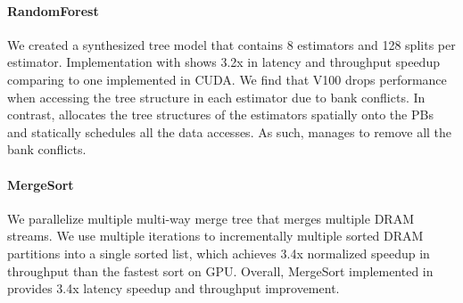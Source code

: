 \paragraph{RandomForest} We created a synthesized tree model that contains 8 estimators and 128 splits per estimator. Implementation with \name{} shows 3.2x in latency and throughput speedup comparing to one implemented in CUDA. We find that V100 drops performance when accessing the tree structure in each estimator due to bank conflicts. In contrast, \name{} allocates the tree structures of the estimators spatially onto the PBs and statically schedules all the data accesses. As such, \name{} manages to remove all the bank conflicts.

\paragraph{MergeSort} We parallelize multiple multi-way merge tree that merges multiple DRAM streams.
We use multiple iterations to incrementally multiple sorted DRAM partitions into a single sorted list, which achieves 3.4x normalized speedup in throughput than the fastest sort on GPU. Overall, MergeSort implemented in \name{} provides 3.4x latency speedup and throughput improvement.
